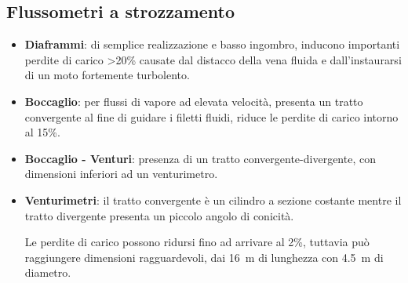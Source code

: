 \documentclass[a4paper, 15pt]{article}
\begin{document}
\subsection{Flussometri a strozzamento}
\begin{adjustwidth}{2in}{}	
	\begin{itemize}
		\item \textbf{Diaframmi}: di semplice realizzazione e basso ingombro, inducono importanti perdite di carico >20\% causate dal distacco della vena fluida e dall'instaurarsi di un moto fortemente turbolento.
		
		\item \textbf{Boccaglio}: per flussi di vapore ad elevata velocità, presenta un tratto convergente al fine di guidare i filetti fluidi, riduce le perdite di carico intorno al 15\%.
		
		\item \textbf{Boccaglio - Venturi}: presenza di un tratto convergente-divergente, con dimensioni inferiori ad un venturimetro.
		
		\item \textbf{Venturimetri}: il tratto convergente è un cilindro a sezione costante mentre il tratto divergente presenta un piccolo angolo di conicità. 
		
		Le perdite di carico possono ridursi fino ad arrivare al 2\%, tuttavia può raggiungere dimensioni ragguardevoli, dai \SI{16}{\metre} di lunghezza con \SI{4.5}{\metre} di diametro.		
	\end{itemize} 
\end{adjustwidth}
\end{document}
